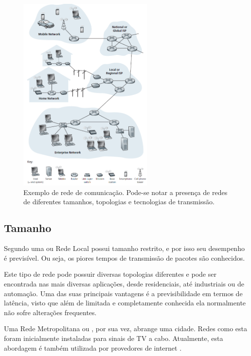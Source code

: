 \begin{figure}[!htb]
	\centering
	\includegraphics[width=0.6\textwidth]{./figuras/Rede_computadores.png} %
	\caption[Exemplo de rede de comunicação]{Exemplo de rede de comunicação. Pode-se notar a presença de redes de diferentes tamanhos, topologias e tecnologias de transmissão.}
	\label{fig_rede_comunicacao}
\end{figure} 

\subsection{Tamanho}
Segundo \cite{Book-Tanenbaum2003} uma  ou Rede Local possui tamanho restrito, e por isso seu desempenho é previsível. Ou seja, os piores tempos de transmissão de pacotes são conhecidos. 

Este tipo de rede pode possuir diversas topologias diferentes e pode ser encontrada nas mais diversas aplicações, desde residenciais, até industriais ou de automação. Uma das suas principais vantagens é a previsibilidade em termos de latência, visto que além de limitada e completamente conhecida ela normalmente não sofre alterações frequentes.

Uma Rede Metropolitana ou , por sua vez, abrange uma cidade. Redes como esta foram inicialmente instaladas para sinais de TV a cabo. Atualmente, esta abordagem é também utilizada por provedores de internet \cite{Book-Tanenbaum2003}.

